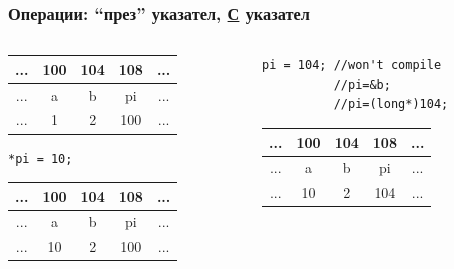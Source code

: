 \documentclass{beamer}
\begin{document}
\begin{frame}[fragile]
\frametitle{Операции: ``през'' указател, \underline{С} указател}


\begin{columns}[t]
  \begin{column}{0.5\textwidth}

\begin{center}

\begin{tabular}{c | c | c | c | c}
... & 100 & 104 & 108 & ...\\\hline
... & a   & b   & pi  & ... \\\hline
... & 1   & 2   & 100 & ... \\

\end{tabular}
\end{center}


\begin{flushleft}
\begin{lstlisting}
*pi = 10;
\end{lstlisting}
\end{flushleft}

\pause

\begin{center}

\begin{tabular}{c | c | c | c | c}
... & 100 & 104 & 108 & ...\\\hline
... & a   & b   & pi  & ... \\\hline
... & \alert{10}   & 2   & 100 & ... \\

\end{tabular}
\end{center}


  \end{column}
  \begin{column}{0.5\textwidth}

\pause
\begin{flushleft}
\begin{lstlisting}
pi = 104; //won't compile
          //pi=&b;
          //pi=(long*)104;
\end{lstlisting}
\end{flushleft}

\begin{center}

\pause

\begin{tabular}{c | c | c | c | c}
... & 100 & 104 & 108 & ...\\\hline
... & a   & b   & pi  & ... \\\hline
... & 10  & 2   & \alert{104} & ... \\


\end{tabular}
\end{center}
\end{column}
\end{columns}
\end{frame}
\end{document}
